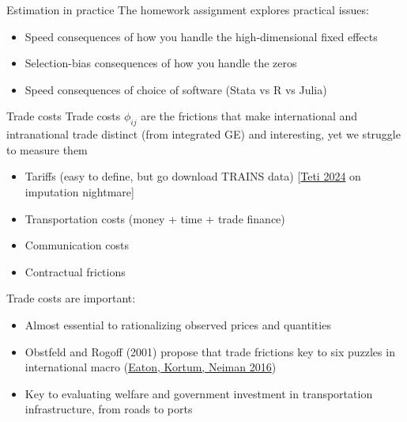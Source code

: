 \documentclass[10pt,notes=hide,aspectratio=169]{beamer}
\begin{document}
\begin{frame}{Estimation in practice}
The homework assignment explores practical issues:
\begin{itemize}
\item Speed consequences of how you handle the high-dimensional fixed effects
\item Selection-bias consequences of how you handle the zeros
\item Speed consequences of choice of software (Stata vs R vs Julia)
\end{itemize}
\end{frame}
\begin{frame}{Trade costs}
Trade costs $\phi_{ij}$ are the frictions that make international and intranational trade distinct (from integrated GE) and interesting, yet we struggle to measure them
\begin{itemize}
	\item Tariffs (easy to define, but go download TRAINS data) [\href{https://www.ifo.de/en/cesifo/publications/2024/working-paper/missing-tariffs}{Teti 2024} on imputation nightmare]
	\item Transportation costs (money + time + trade finance)
	\item Communication costs
	\item Contractual frictions
\end{itemize}
Trade costs are important:
\begin{itemize}
	\item Almost essential to rationalizing observed prices and quantities
	\item Obstfeld and Rogoff (2001) propose that trade frictions key to six puzzles in international macro (\href{https://www.sciencedirect.com/science/article/pii/S0165188916301014}{Eaton, Kortum, Neiman 2016})
	\item Key to evaluating welfare and government investment in transportation infrastructure, from roads to ports
\end{itemize}
\end{frame}
\end{document}
